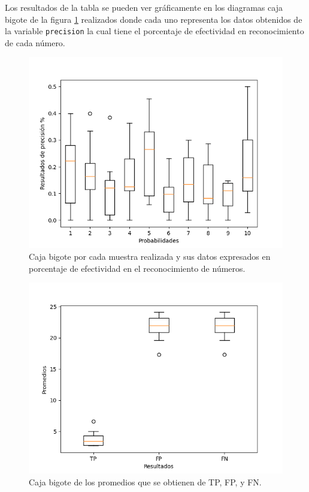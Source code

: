 \documentclass[a4paper, 11pt]{article}
\begin{document}
\bigskip
Los resultados de la tabla se pueden ver gráficamente en los diagramas caja bigote de la figura \ref{f2} realizados donde cada uno representa los datos obtenidos de la variable \texttt{precision} la cual tiene el porcentaje de efectividad en reconocimiento de cada número.

\begin{figure}[H]
  \centering      
  \includegraphics[scale=.8]{boxplot1.png}
  \caption{Caja bigote por cada muestra realizada y sus datos expresados en porcentaje de efectividad en el reconocimiento de números.}
  \label{f2}
\end{figure}

\begin{figure}[H]
  \centering      
  \includegraphics[scale=.8]{boxplot2.png}
  \caption{Caja bigote de los promedios que se obtienen de TP, FP, y FN.}
  \label{f3}
\end{figure}
\end{document}
